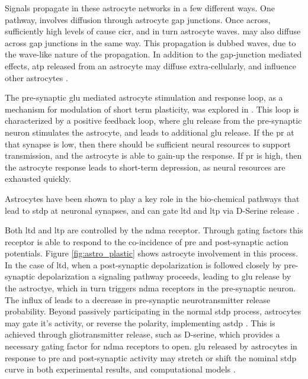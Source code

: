     Signals propagate in these astrocyte networks in a few different
    ways. One pathway, involves \ipt diffusion through astrocyte gap
    junctions. Once across, sufficiently high levels of \ipt cause
    \gls{cicr}, and in turn astrocyte waves. \ca may also diffuse across gap
    junctions in the same way. This propagation is dubbed \ca waves, due to
    the wave-like nature of the propagation. In addition to the gap-junction
    mediated effects, \gls{atp} released from an astrocyte may diffuse
    extra-cellularly, and influence other astrocytes \parencite{amiri_2013}.
    
    The pre-synaptic \gls{glu} mediated astrocyte stimulation and response loop,
    as a mechanism for modulation of short term plasticity, was explored in
    \parencite{pitta_2012}. This loop is characterized by a positive feedback
    loop, where \gls{glu} release from the pre-synaptic neuron stimulates the
    astrocyte, and leads to additional \gls{glu} release. If the \acrshort{pr}
    at that synapse is low, then there should be sufficient neural resources to
    support transmission, and the astrocyte is able to gain-up the response. If
    \acrshort{pr} is high, then the astrocyte response leads to short-term
    depression, as neural resources are exhausted quickly.

    Astrocytes have been shown to play a key role in the bio-chemical pathways
    that lead to \gls{stdp} at neuronal synapses, and can gate \gls{ltd} and \gls{ltp} via D-Serine
    release \parencite{manninen_2019}.

    Both \gls{ltd} and \gls{ltp} are controlled by the \gls{ndma}
    receptor. Through gating factors this receptor is able to respond to the
    co-incidence of pre and post-synaptic action potentials. Figure
    \ref{fig:astro_plastic} shows astrocyte involvement in this process. In the
    case of \gls{ltd}, when a post-synaptic depolarization is followed closely
    by pre-synaptic depolarization a signaling pathway proceeds, leading to
    \gls{glu} release by the astroctye, which in turn triggers \gls{ndma}
    receptors in the pre-synaptic neuron. The influx of \ca leads to a decrease
    in pre-synaptic neurotransmitter release probability. Beyond passively
    participating in the normal \gls{stdp} process, astrocytes may gate it's
    activity, or reverse the polarity, implementing \gls{astdp}
    \parencite{min_2012}. This is achieved through gliotransmitter release, such as
    D-serine, which provides a necessary gating factor for \gls{ndma} receptors
    to open. \Gls{glu} released by astrocytes in response to pre and
    post-synaptic activity may stretch or shift the nominal \gls{stdp} curve
    in both experimental results, and computational models \parencite{pitta_2016}.

